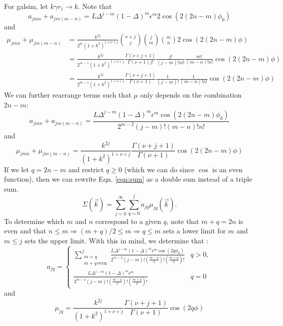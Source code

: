 \documentclass{article}
\begin{document}
For galsim, let $k \gamma r_1 \rightarrow k$.
Note that
\begin{equation}
  a_{jmn} + a_{jm(m-n)} = L \Delta^{j-m}(1-\Delta)^m\epsilon^m2\cos(2 (2n-m) \phi_0)
\end{equation}
and
\begin{equation}
  \begin{split}
    \mu_{jmn} + \mu_{jm(m-n)} & = \frac{k^{2j}}{2^m(1+k^2)^{1+\nu+j}}\binom{\nu+j}{j}\binom{j}{m}\binom{m}{n}2 \cos(2 (2n-m) \phi) \\
    & = \frac{k^{2j}}{2^{m-1}(1+k^2)^{1+\nu+j}}
    \frac{\Gamma(\nu+j+1)}{\Gamma(\nu+1) j!}
    \frac{j!}{(j-m)!m!}
    \frac{m!}{(m-n)!n!}
    \cos(2 (2n-m) \phi) \\
    & = \frac{k^{2j}}{2^{m-1}(1+k^2)^{1+\nu+j}}
    \frac{\Gamma(\nu+j+1)}{\Gamma(\nu+1)}
    \frac{1}{(j-m)!}
    \frac{1}{(m-n)!n!}
    \cos(2 (2n-m) \phi)
  \end{split}
\end{equation}
We can further rearrange terms such that $\mu$ only depends on the combination $2n-m$:
\begin{equation}
  a_{jmn} + a_{jm(m-n)} = \frac{L \Delta^{j-m}(1-\Delta)^m\epsilon^m\cos(2 (2n-m) \phi_0)}
  {2^{m-2}(j-m)!(m-n)!n!}
\end{equation}
and
\begin{equation}
  \mu_{jmn} + \mu_{jm(m-n)} = \frac{k^{2j}}{(1+k^2)^{1+\nu+j}}
    \frac{\Gamma(\nu+j+1)}{\Gamma(\nu+1)}
    \cos(2 (2n-m) \phi)
\end{equation}
If we let $q=2n-m$ and restrict $q \ge 0$ (which we can do since $\cos$ is an even function), then we can rewrite Eqn. \ref{eqn:sum} as a double sum instead of a triple sum.
\begin{equation}
  \Sigma(\vec{k}) = \sum_{j=0}^{\infty}\sum_{q=0}^{j} a_{jq}\mu_{jq}(\vec{k}).
\end{equation}
To determine which $m$ and $n$ correspond to a given $q$, note that $m+q=2n$ is even and that $n \le m \Rightarrow (m+q)/2 \le m \Rightarrow q \le m$ sets a lower limit for $m$ and $m \le j$ sets the upper limit.
With this in mind, we determine that :
\begin{equation}
  a_{jq} = \begin{cases} \sum_{\substack{m=q\\m+q\,\mathrm{even}}}^{j}\frac{L \Delta^{j-m}(1-\Delta)^m\epsilon^m\cos(2 q \phi_0)}
    {2^{m-2}(j-m)!(\frac{m-q}{2})!(\frac{m+q}{2})!} & q > 0,\\
    \frac{L \Delta^{j-m}(1-\Delta)^m\epsilon^m}
         {2^{m-4}(j-m)!(\frac{m-q}{2})!(\frac{m+q}{2})!} & q = 0
  \end{cases}
\end{equation}
and
\begin{equation}
  \mu_{jq} = \frac{k^{2j}}{(1+k^2)^{1+\nu+j}}\frac{\Gamma(\nu+j+1)}{\Gamma(\nu+1)}\cos(2 q \phi)
\end{equation}
\end{document}
